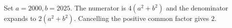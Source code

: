 Set $a=2000,b=2025$. The numerator is $4(a^2+b^2)$ and the denominator expands to $2(a^2+b^2)$. Cancelling the positive common factor gives $\boxed2$.
